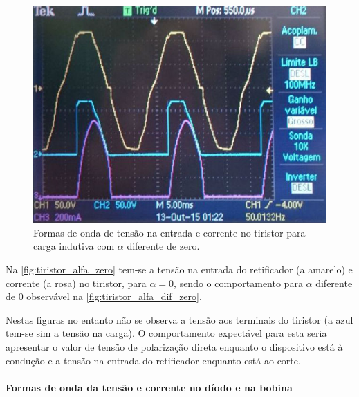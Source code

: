 \documentclass[a4paper,11pt]{article}
\numberwithin{equation}{section}
\begin{document}
\begin{figure}[h]
	\centering
	\includegraphics[keepaspectratio=true, scale=0.43]{img/figs/tiristor_alfa_dif_zero}
	\caption{Formas de onda de tensão na entrada e corrente no tiristor para carga indutiva com $\alpha$ diferente de zero.}
	\label{fig:tiristor_alfa_dif_zero}
	\vspace{-0.8em}
\end{figure}

Na \autoref{fig:tiristor_alfa_zero} tem-se a tensão na entrada do retificador (a amarelo) e corrente (a rosa) no tiristor, para $\alpha = 0$, sendo o comportamento para $\alpha$ diferente de $0$ observável na \autoref{fig:tiristor_alfa_dif_zero}.

Nestas figuras no entanto não se observa a tensão aos terminais do tiristor (a azul tem-se sim a tensão na carga). O comportamento expectável para esta seria apresentar o valor de tensão de polarização direta enquanto o dispositivo está à condução e a tensão na entrada do retificador enquanto está ao corte.

\paragraph{Formas de onda da tensão e corrente no díodo e na bobina}
\end{document}
